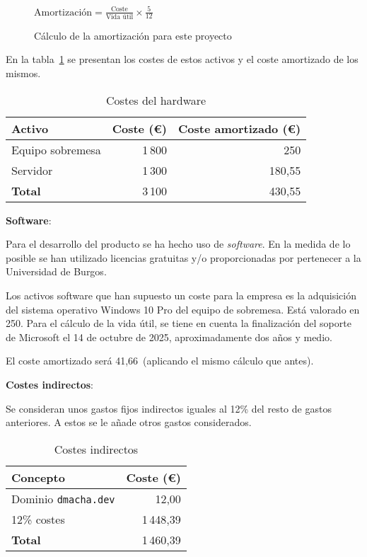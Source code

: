 \begin{figure}[H]
\begin{center}
$\text{Amortización} = \frac{\text{Coste}}{\text{Vida útil}} \times \frac{5}{12}$
\end{center}
\caption{Cálculo de la amortización para este proyecto}
\end{figure}


En la tabla~\ref{tabla:hardware} se presentan los costes de estos activos y el
coste amortizado de los mismos.

\begin{table}[H]
    \centering
\begin{tabular}{lrr}
\toprule
\textbf{Activo}      & \textbf{Coste (€)}      & \textbf{Coste amortizado (€)}      \\ \midrule
Equipo sobremesa     & 1\,800                    & 250                      \\
Servidor             & 1\,300                    & 180,55                      \\ \midrule
\textbf{Total}       & 3\,100                    & 430,55                      \\ \midrule
\end{tabular}
\caption{Costes del hardware}
\label{tabla:hardware}
\end{table}


\textbf{Software}:

Para el desarrollo del producto se ha hecho uso de \textit{software}. En la
medida de lo posible se han utilizado licencias gratuitas y/o proporcionadas por
pertenecer a la Universidad de Burgos.

Los activos software que han supuesto un coste para la empresa es la adquisición
del sistema operativo Windows 10 Pro del equipo de sobremesa. Está valorado en
250\texteuro. Para el cálculo de la vida útil, se tiene en cuenta la
finalización del soporte de Microsoft el 14 de octubre de 2025, aproximadamente
dos años y medio.

El coste amortizado será 41,66\texteuro~(aplicando el mismo cálculo que antes).

\clearpage
\textbf{Costes indirectos}:

Se consideran unos gastos fijos indirectos iguales al 12\% del resto de gastos
anteriores. A estos se le añade otros gastos considerados.

\begin{table}[H]
    \centering
\begin{tabular}{lr}
\toprule
\textbf{Concepto}      & \textbf{Coste (€)}     \\ \midrule
Dominio \texttt{dmacha.dev}     & 12,00                    \\
12\% costes                & 1\,448,39                     \\ \midrule
\textbf{Total}       & 1\,460,39                     \\ \midrule
\end{tabular}
\caption{Costes indirectos}
\label{tabla:indirectos}
\end{table}


